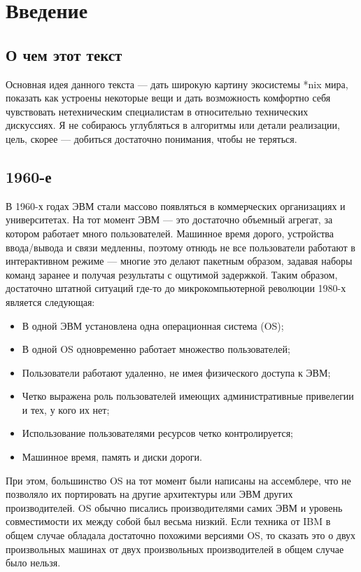 \section{Введение}
\subsection{О чем этот текст}
Основная идея данного текста --- дать широкую картину экосистемы *nix мира, показать как устроены некоторые вещи и дать возможность комфортно себя чувствовать нетехническим специалистам в относительно технических дискуссиях. Я не собираюсь углубляться в алгоритмы или детали реализации, цель, скорее --- добиться достаточно понимания, чтобы не теряться.

\subsection{1960-е}
В 1960-х годах ЭВМ стали массово появляться в коммерческих организациях и университетах. На тот момент ЭВМ --- это достаточно объемный агрегат, за котором работает много пользователей. Машинное время дорого, устройства ввода/вывода и связи медленны, поэтому отнюдь не все пользователи работают в интерактивном режиме --- многие это делают пакетным образом, задавая наборы команд заранее и получая результаты с ощутимой задержкой. Таким образом, достаточно штатной ситуаций где-то до микрокомпьютерной революции 1980-х является следующая:
\begin{itemize}
  \item В одной ЭВМ установлена одна операционная система (OS);
  \item В одной OS одновременно работает множество пользователей;
  \item Пользователи работают удаленно, не имея физического доступа к ЭВМ;
  \item Четко выражена роль пользователей имеющих административные привелегии и тех, у кого их нет;
  \item Использование пользователями ресурсов четко контролируется;
  \item Машинное время, память и диски дороги.
\end{itemize}

При этом, большинство OS на тот момент были написаны на ассемблере, что не позволяло их портировать на другие архитектуры или ЭВМ других производителей. OS обычно писались производителями самих ЭВМ и уровень совместимости их между собой был весьма низкий. Если техника от IBM в общем случае обладала достаточно похожими версиями OS, то сказать это о двух произвольных машинах от двух произвольных производителей в общем случае было нельзя.

